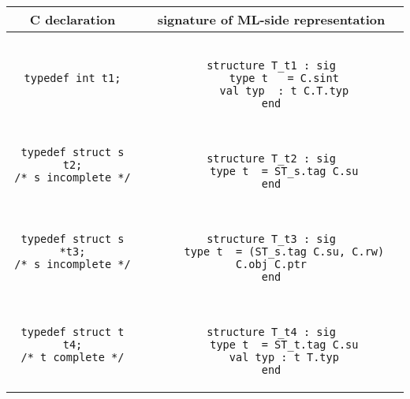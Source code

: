 \documentclass[titlepage,letterpaper]{article}
\begin{document}
\begin{small}
\begin{center}
\begin{tabular}{c|c}
C declaration & signature of ML-side representation \\ \hline\hline
\begin{minipage}{2in}
\begin{verbatim}
typedef int t1;
\end{verbatim}
\end{minipage}
&
\begin{minipage}{4in}
\begin{verbatim}

structure T_t1 : sig
    type t   = C.sint
    val typ  : t C.T.typ
end

\end{verbatim}
\end{minipage}
\\ \hline
\begin{minipage}{2in}
\begin{verbatim}
typedef struct s t2;
/* s incomplete */
\end{verbatim}
\end{minipage}
&
\begin{minipage}{4in}
\begin{verbatim}

structure T_t2 : sig
    type t  = ST_s.tag C.su
end

\end{verbatim}
\end{minipage}
\\ \hline
\begin{minipage}{2in}
\begin{verbatim}
typedef struct s *t3;
/* s incomplete */
\end{verbatim}
\end{minipage}
&
\begin{minipage}{4in}
\begin{verbatim}

structure T_t3 : sig
    type t  = (ST_s.tag C.su, C.rw) C.obj C.ptr
end

\end{verbatim}
\end{minipage}
\\ \hline
\begin{minipage}{2in}
\begin{verbatim}
typedef struct t t4;
/* t complete */
\end{verbatim}
\end{minipage}
&
\begin{minipage}{4in}
\begin{verbatim}

structure T_t4 : sig
    type t  = ST_t.tag C.su
    val typ : t T.typ
end

\end{verbatim}
\end{minipage}
\end{tabular}
\end{center}
\end{small}
\end{document}
